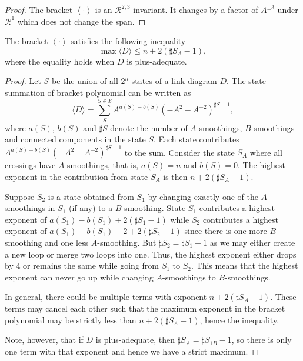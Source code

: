 \begin{proof}
\label{sec:first-tait-conj-10}
The bracket $\left< \cdot \right>$ is an $\mathcal{R}^{2,3}$-invariant. It changes by a factor of $A^{\pm 3}$ under $\mathcal{R}^1$ which does not change the span.
\end{proof}

\begin{lemma}
\label{sec:first-tait-conj-17}
The bracket $\left< \cdot \right>$ satisfies the following inequality
\begin{displaymath}
\max \langle D \rangle \leq n + 2(\sharp S_A - 1),
\end{displaymath}
where the equality holds when $D$ is plus-adequate.
\end{lemma}

\begin{proof}
  \label{sec:first-tait-conj-18}
Let $\mathcal{S}$ be the union of all $2^n$ states of a link diagram $D$. The state-summation of bracket polynomial can be written as 
\begin{displaymath}
\langle D \rangle = \sum_{S}^{S\in \mathcal{S}} A^{a(S)-b(S)} (-A^2 - A^{-2})^{\sharp S - 1},
\end{displaymath}
where $a(S)$, $b(S)$ and $\sharp S$ denote the number of $A$-smoothings, $B$-smoothings and connected components in the state $S$. 
  Each state contributes $A^{a(S)-b(S)} (-A^2 - A^{-2})^{\sharp S - 1}$ to the sum. Consider the state $S_A$ where all crossings have $A$-smoothings, that is, $a(S) = n$ and $b(S) = 0$. The highest exponent in the contribution from state $S_A$ is then $n + 2(\sharp S_A - 1)$.
  
  Suppose $S_2$ is a state obtained from $S_1$ by changing exactly one of the $A$-smoothings in $S_1$ (if any) to a $B$-smoothing. State $S_1$ contributes a highest exponent of $a(S_1)-b(S_1)+2(\sharp S_1 -1)$ while $S_2$ contributes a highest exponent of $a(S_1)-b(S_1)-2 + 2(\sharp S_2 -1)$ since there is one more $B$-smoothing and one less $A$-smoothing. But $\sharp S_2 = \sharp S_1 \pm 1$ as we may either create a new loop or merge two loops into one. Thus, the highest exponent either drops by $4$ or remains the same while going from $S_1$ to $S_2$. This means that the highest exponent can never go up while changing $A$-smoothings to $B$-smoothings.

  In general, there could be multiple terms with exponent $n + 2(\sharp S_A - 1)$. These terms may cancel each other such that the maximum exponent in the bracket polynomial may be strictly less than $n + 2(\sharp S_A - 1)$, hence the inequality.

Note, however, that if $D$ is plus-adequate, then $\sharp S_A = \sharp S_{1B} - 1$, so there is only one term with that exponent and hence we have a strict maximum.
\end{proof}

